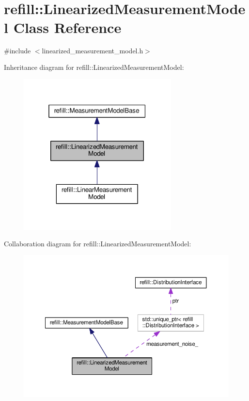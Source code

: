 \hypertarget{classrefill_1_1LinearizedMeasurementModel}{}\section{refill\+:\+:Linearized\+Measurement\+Model Class Reference}
\label{classrefill_1_1LinearizedMeasurementModel}


{\ttfamily \#include $<$linearized\+\_\+measurement\+\_\+model.\+h$>$}



Inheritance diagram for refill\+:\+:Linearized\+Measurement\+Model\+:\nopagebreak
\begin{figure}[H]
\begin{center}
\leavevmode
\includegraphics[width=229pt]{classrefill_1_1LinearizedMeasurementModel__inherit__graph}
\end{center}
\end{figure}


Collaboration diagram for refill\+:\+:Linearized\+Measurement\+Model\+:\nopagebreak
\begin{figure}[H]
\begin{center}
\leavevmode
\includegraphics[width=350pt]{classrefill_1_1LinearizedMeasurementModel__coll__graph}
\end{center}
\end{figure}
